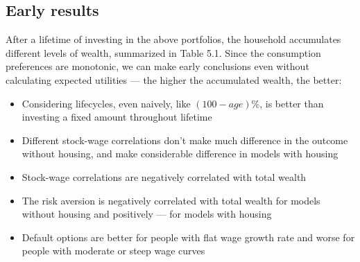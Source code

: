 \subsection{Early results}

After a lifetime of investing in the above portfolios, the household accumulates different levels of wealth, summarized in Table 5.1. Since the consumption preferences are monotonic, we can make early conclusions even without calculating expected utilities --- the higher the accumulated wealth, the better: 

\begin{itemize}
\item Considering lifecycles, even naively, like $(100-age)\%$, is better than investing a fixed amount throughout lifetime
\item Different stock-wage correlations don't make much difference in the outcome without housing, and make considerable difference in models with housing
\item Stock-wage correlations are negatively correlated with total wealth
\item The risk aversion is negatively correlated with total wealth for models without housing and positively --- for models with housing
\item Default options are better for people with flat wage growth rate and worse for people with moderate or steep wage curves
\end{itemize}

